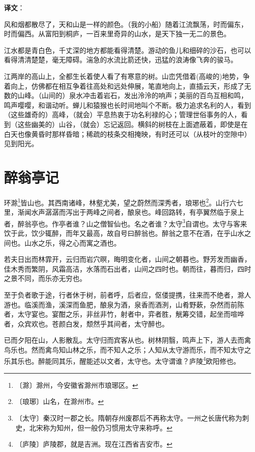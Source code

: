\documentclass[12pt,UTF-8,openany]{ctexbook}
\begin{document}
\newpage

\textbf{译文}：

\vspace{1em}

\begin{normalsize}
    
    风和烟都散尽了，天和山是一样的颜色。（我的小船）随着江流飘荡，时而偏东，时而偏西。从富阳到桐庐，一百来里奇异的山水，是天下独一无二的景色。
    
    江水都是青白色，千丈深的地方都能看得清楚。游动的鱼儿和细碎的沙石，也可以看得清清楚楚，毫无障碍。湍急的水流比箭还快，迅猛的浪涛像飞奔的骏马。
    
    江两岸的高山上，全都生长着使人看了有寒意的树。山峦凭借着(高峻的)地势，争着向上，仿佛都在相互争着往高处和远处伸展，笔直地向上，直插云天，形成了无数的山峰。（山间的）泉水冲击着岩石，发出泠泠的响声；美丽的百鸟互相和鸣，鸣声嘤嘤，和谐动听。蝉儿和猿猴也长时间地叫个不断。极力追求名利的人，看到（这些雄奇的）高峰，（就会）平息热衷于功名利禄的心；管理世俗事务的人，看到（这些幽美的）山谷，（就会）忘记返回。横斜的树枝在上面遮蔽着，即使是在白天也像黄昏时那样昏暗；稀疏的枝条交相掩映，有时还可以（从枝叶的空隙中）见到阳光。
    
\end{normalsize}



\chapter{醉翁亭记}

\begin{normalsize}
    
    环滁\footnote{〔滁〕滁州，今安徽省滁州市琅琊区。}皆山也。其西南诸峰，林壑尤美，望之蔚然而深秀者，琅琊也\footnote{〔琅琊〕山名，在滁州市。}。山行六七里，渐闻水声潺潺而泻出于两峰之间者，酿泉也。峰回路转，有亭翼然临于泉上者，醉翁亭也。作亭者谁？山之僧智仙也。名之者谁？太守\footnote{〔太守〕秦汉时一郡之长。隋朝存州废郡后不再称太守。一州之长唐代称为刺史，北宋称为知州，但一般仍习惯用太守来称呼。}自谓也。太守与客来饮于此，饮少辄醉，而年又最高，故自号曰醉翁也。醉翁之意不在酒，在乎山水之间也。山水之乐，得之心而寓之酒也。
    
    若夫日出而林霏开，云归而岩穴暝，晦明变化者，山间之朝暮也。野芳发而幽香，佳木秀而繁阴，风霜高洁，水落而石出者，山间之四时也。朝而往，暮而归，四时之景不同，而乐亦无穷也。
    
    至于负者歌于途，行者休于树，前者呼，后者应，伛偻提携，往来而不绝者，滁人游也。临溪而渔，溪深而鱼肥，酿泉为酒，泉香而酒洌，山肴野蔌，杂然而前陈者，太守宴也。宴酣之乐，非丝非竹，射者中，弈者胜，觥筹交错，起坐而喧哗者，众宾欢也。苍颜白发，颓然乎其间者，太守醉也。
    
    已而夕阳在山，人影散乱。太守归而宾客从也。树林阴翳，鸣声上下，游人去而禽鸟乐也。然而禽鸟知山林之乐，而不知人之乐；人知从太守游而乐，而不知太守之乐其乐也。醉能同其乐，醒能述以文者，太守也。太守谓谁？庐陵\footnote{〔庐陵〕庐陵郡，就是吉洲。现在江西省吉安市。}欧阳修也。
\end{normalsize}
\end{document}
